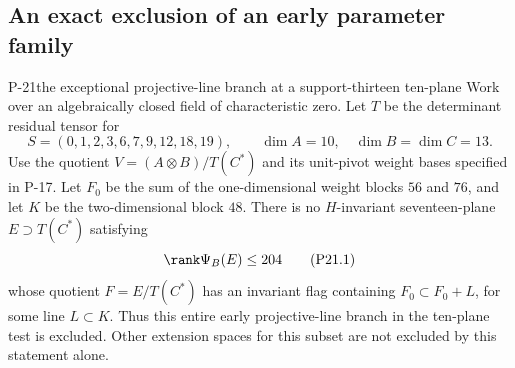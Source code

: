 \subsection{An exact exclusion of an early parameter family}
\begin{finding}{P-21}{the exceptional projective-line branch at a support-thirteen ten-plane}
Work over an algebraically closed field of characteristic zero.
Let $T$ be the determinant residual tensor for
\[
 S=(0,1,2,3,6,7,9,12,18,19),
 \qquad \dim A=10,\quad\dim B=\dim C=13.
\]
Use the quotient $V=(A\otimes B)/T(C^*)$ and its unit-pivot
weight bases specified in P-17. Let $F_0$ be the sum of the
one-dimensional weight blocks $56$ and $76$, and let $K$
be the two-dimensional block $48$. There is no $H$-invariant
seventeen-plane $E\supset T(C^*)$ satisfying
\[
 \rank\Psi_B(E)\leq204
 \tag{P21.1}
\]
whose quotient $F=E/T(C^*)$ has an invariant flag containing
$F_0\subset F_0+L$, for some line $L\subset K$.
Thus this entire early projective-line branch in the
ten-plane test is excluded. Other extension spaces for
this subset are not excluded by this statement alone.
\end{finding}
